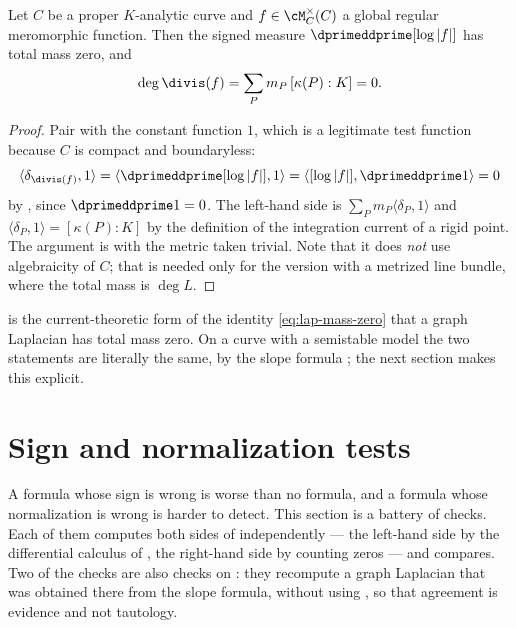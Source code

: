\begin{corollary}
\label{cor:ch15-degree-zero}
Let $C$ be a proper $K$-analytic curve and $f\in\cM_C^\times(C)$ a global
regular meromorphic function.  Then the signed measure
$\dprimeddprime[\log|f|]$ has total mass zero, and
\[
 \deg\divis(f)=\sum_Pm_P\,[\kappa(P):K]=0 .
\]
\end{corollary}

\begin{proof}
Pair  with the constant function $1$, which is
a legitimate test function because $C$ is compact and boundaryless:
\[
 \langle\delta_{\divis(f)},1\rangle
 =\langle\dprimeddprime[\log|f|],1\rangle
 =\langle[\log|f|],\dprimeddprime1\rangle=0
\]
by , since $\dprimeddprime1=0$.  The
left-hand side is $\sum_Pm_P\langle\delta_P,1\rangle$ and
$\langle\delta_P,1\rangle=[\kappa(P):K]$ by the definition of the integration
current of a rigid point.  The argument is \cite[Corollary~18.1.7]{CLD25}
with the metric taken trivial.  Note that it does \emph{not} use algebraicity
of $C$; that is needed only for the version with a metrized line bundle,
where the total mass is $\deg L$.
\end{proof}

 is the current-theoretic form of the identity
\eqref{eq:lap-mass-zero} that a graph Laplacian has total mass zero.  On a
curve with a semistable model the two statements are literally the same, by
the slope formula ; the next section makes this
explicit.

\section{Sign and normalization tests}
\label{sec:ch15-tests}

A formula whose sign is wrong is worse than no formula, and a formula whose
normalization is wrong is harder to detect.  This section is a battery of
checks.  Each of them computes both sides of 
independently --- the left-hand side by the differential calculus of
, the right-hand side by counting
zeros --- and compares.  Two of the checks are also checks on
: they recompute a graph Laplacian that was
obtained there from the slope formula, without using
, so that agreement is evidence and not
tautology.

